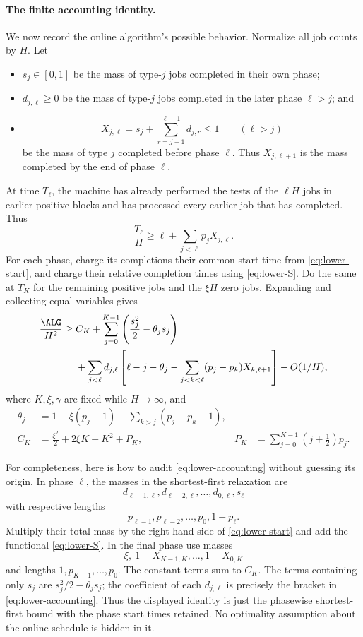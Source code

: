 \paragraph{The finite accounting identity.}
We now record the online algorithm's possible behavior.  Normalize all job
counts by $H$.  Let
\begin{itemize}
\item $s_j\in[0,1]$ be the mass of type-$j$ jobs completed in their own
      phase;
\item $d_{j,\ell}\ge0$ be the mass of type-$j$ jobs completed in the later
      phase $\ell>j$; and
\item
\[
  X_{j,\ell}=s_j+\sum_{r=j+1}^{\ell-1}d_{j,r}\le1
  \qquad(\ell>j)
\]
be the mass of type $j$ completed before phase $\ell$.  Thus
$X_{j,\ell+1}$ is the mass completed by the end of phase $\ell$.
\end{itemize}
At time $T_\ell$, the machine has already performed the tests of the $\ell H$
jobs in earlier positive blocks and has processed every earlier job that has
completed.  Thus
\begin{equation}
  \frac{T_\ell}{H}
  \ge \ell+\sum_{j<\ell}p_jX_{j,\ell}.
  \label{eq:lower-start}
\end{equation}
For each phase, charge its completions their common start time from
\cref{eq:lower-start}, and charge their relative completion times using
\cref{eq:lower-S}.  Do the same at $T_K$ for the remaining positive jobs
and the $\xi H$ zero jobs.  Expanding and collecting equal variables gives
\begin{align}
 \frac{\ALG}{H^2}
 \ge{}& C_K
 +\sum_{j=0}^{K-1}\left(\frac{s_j^2}{2}-\theta_js_j\right)
 \nonumber\\
 &+\sum_{j<\ell}d_{j,\ell}
 \left[
   \ell-j-\theta_j
   -\sum_{j<k<\ell}(p_j-p_k)X_{k,\ell+1}
 \right]-O(1/H),
 \label{eq:lower-accounting}
\end{align}
where $K,\xi,\gamma$ are fixed while $H\to\infty$, and
\begin{align}
 \theta_j
   &=1-\xi(p_j-1)-\sum_{k>j}(p_j-p_k-1),
   \label{eq:lower-theta}\\
 C_K
   &=\frac{\xi^2}{2}+2\xi K+K^2+P_K,
 &
 P_K&=\sum_{j=0}^{K-1}\left(j+\frac12\right)p_j.
 \label{eq:lower-CP}
\end{align}

For completeness, here is how to audit
\cref{eq:lower-accounting} without guessing its origin.  In phase $\ell$,
the masses in the shortest-first relaxation are
\[
 d_{\ell-1,\ell},d_{\ell-2,\ell},\ldots,d_{0,\ell},s_\ell
\]
with respective lengths
\[
 p_{\ell-1},p_{\ell-2},\ldots,p_0,1+p_\ell.
\]
Multiply their total mass by the right-hand side of
\cref{eq:lower-start} and add the functional
\cref{eq:lower-S}.  In the final phase use masses
\[
 \xi,\ 1-X_{K-1,K},\ldots,1-X_{0,K}
\]
and lengths $1,p_{K-1},\ldots,p_0$.  The constant terms sum to $C_K$.
The terms containing only $s_j$ are $s_j^2/2-\theta_js_j$; the coefficient
of each $d_{j,\ell}$ is precisely the bracket in
\cref{eq:lower-accounting}.  Thus the displayed identity is just the
phasewise shortest-first bound with the phase start times retained.  No
optimality assumption about the online schedule is hidden in it.

